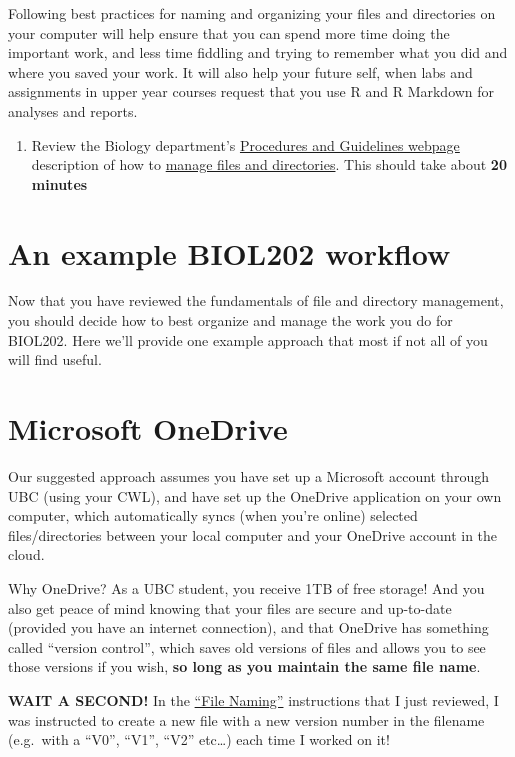 \documentclass[
]{book}
\providecommand{\tightlist}{%
  \setlength{\itemsep}{0pt}\setlength{\parskip}{0pt}}
\begin{document}
Following best practices for naming and organizing your files and directories on your computer will help ensure that you can spend more time doing the important work, and less time fiddling and trying to remember what you did and where you saved your work. It will also help your future self, when labs and assignments in upper year courses request that you use R and R Markdown for analyses and reports.

\begin{enumerate}
\def\labelenumi{\arabic{enumi}.}
\tightlist
\item
  Review the Biology department's \href{https://ubco-biology.github.io/Procedures-and-Guidelines/}{Procedures and Guidelines webpage} description of how to \href{https://ubco-biology.github.io/Procedures-and-Guidelines/file-and-data-management.html}{manage files and directories}. This should take about \textbf{20 minutes}
\end{enumerate}

\section{An example BIOL202 workflow}\label{biol202_workflow}

Now that you have reviewed the fundamentals of file and directory management, you should decide how to best organize and manage the work you do for BIOL202. Here we'll provide one example approach that most if not all of you will find useful.

\section{Microsoft OneDrive}\label{onedrive}

Our suggested approach assumes you have set up a Microsoft account through UBC (using your CWL), and have set up the OneDrive application on your own computer, which automatically syncs (when you're online) selected files/directories between your local computer and your OneDrive account in the cloud.

Why OneDrive? As a UBC student, you receive 1TB of free storage! And you also get peace of mind knowing that your files are secure and up-to-date (provided you have an internet connection), and that OneDrive has something called ``version control'', which saves old versions of files and allows you to see those versions if you wish, \textbf{so long as you maintain the same file name}.

\textbf{WAIT A SECOND!} In the \href{https://ubco-biology.github.io/Procedures-and-Guidelines/file-naming.html}{``File Naming''} instructions that I just reviewed, I was instructed to create a new file with a new version number in the filename (e.g.~with a ``V0'', ``V1'', ``V2'' etc\ldots) each time I worked on it!
\end{document}
